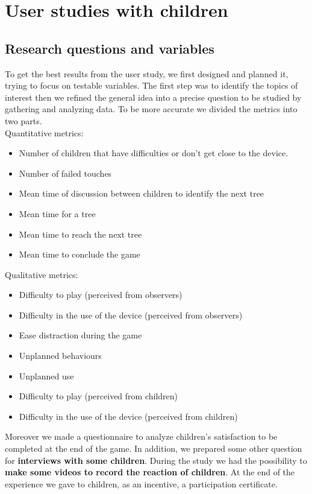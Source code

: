 \documentclass[a4paper,11pt]{report}
\begin{document}
\section{User studies with children}
\subsection{Research questions and variables} 
To get the best results from the user study, we first designed and planned it, trying to focus on testable variables. The first step was to identify the topics of interest then we refined the general idea into a precise question to be studied by gathering and analyzing data. To be more accurate we divided the metrics into two parts.\\
Quantitative metrics:
\begin{itemize}
	\item Number of children that have difficulties or don't get close to the device.
	\item Number of failed touches
	\item Mean time of discussion between children to identify the next tree
	\item Mean time for a tree
	\item Mean time to reach the next tree
	\item Mean time to conclude the game
\end{itemize}
Qualitative metrics:
\begin{itemize}
	\item Difficulty to play (perceived from observers)
	\item Difficulty in the use of the device (perceived from observers)
	\item Ease distraction during the game
	\item Unplanned behaviours 
	\item Unplanned use
	\item Difficulty to play (perceived from children)
	\item Difficulty in the use of the device (perceived from children)
\end{itemize}
Moreover we made a questionnaire to analyze children's satisfaction to be completed at the end of the game. In addition, we prepared some other question for \textbf{interviews with some children}. During the study we had the possibility to \textbf{make some videos to record the reaction of children}. At the end of the experience we gave to children, as an incentive, a participation certificate. 
\end{document}
